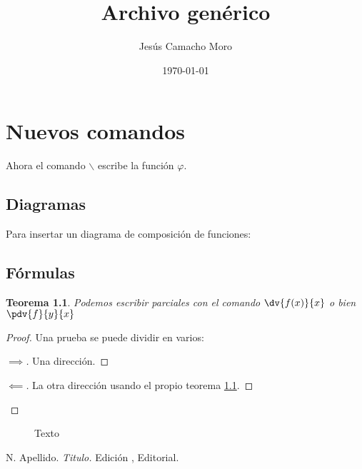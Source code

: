\documentclass[ebook,oneside]{memoir}
\title{Archivo genérico}
\author{Jesús Camacho Moro}
\date{\today}
\renewcommand{\phi}{\varphi}
\newtheorem{thm}{Teorema}[chapter]
\newenvironment{subproof}[1][\proofname]{%
	\renewcommand{\qedsymbol}{$\blacksquare$}%
	\begin{proof}[#1]%
	}{%
	\end{proof}%
}
\begin{document}
	
\maketitle

\tableofcontents

\listoftheorems[ignore=thm]

\chapter{Nuevos comandos}
Ahora el comando $\backslash$ escribe la función $\phi$. 

\section{Diagramas}
Para insertar un diagrama de composición de funciones:



\section{Fórmulas}

\begin{thm}\label{vínculo}
Podemos escribir parciales con el comando $\dv{f(x)}{x}$ o bien $\pdv{f}{y}{x}$
\end{thm}

\begin{proof}
Una prueba se puede dividir en varios:
\begin{subproof}[$\implies$]
Una dirección.
\end{subproof}
\begin{subproof}[$\impliedby$]
La otra dirección usando el propio teorema \ref{vínculo}.
\end{subproof}
\end{proof}

\begin{figure}[h]
	\centering
	\caption{Texto}
	\label{fig:texto}
\end{figure}




\begin{thebibliography}{}
	
 N. Apellido. \textit{Titulo.} Edición , Editorial.
	
\end{thebibliography}
\end{document}
